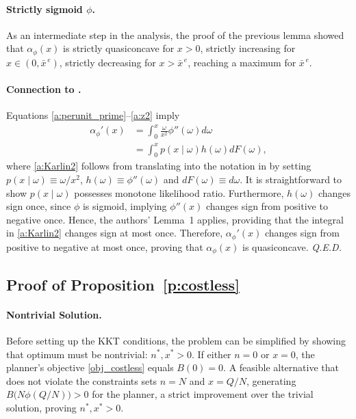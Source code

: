 \documentclass[12pt]{article}
\renewcommand{\qed}{{\it Q.E.D.}}
\newcommand{\efficacy}{\phi}
\newcommand{\benefit}{B}
\newcommand{\xunitbar}{\bar{x}^{\,e}}
\newcommand{\perunit}[1]{\alpha_{#1}}
\begin{document}
\paragraph{Strictly sigmoid $\efficacy$.} 

As an intermediate step in the analysis, the proof of the previous
lemma showed that $\perunit{\efficacy}\!(x)$ is strictly quasiconcave
for $x > 0$, strictly increasing for $x \in (0, \xunitbar)$, strictly
decreasing for $x > \xunitbar$, reaching a maximum for $\xunitbar$.

\paragraph{Connection to \citet{Karlin1956}.} 

Equations \eqref{a:perunit_prime}--\eqref{a:z2} imply
\begin{align}
\perunit{\efficacy}'\!(x) & = \int_0^x \frac{\omega}{x^2}
\efficacy''(\omega) d\omega \label{a:Karlin} \\ & = \int_0^x p(x \mid
\omega) h(\omega) dF(\omega), \label{a:Karlin2}
\end{align}
where \eqref{a:Karlin2} follows from translating into the notation in
\citet{Karlin1956} by setting $p(x\mid\omega) \equiv \omega / x^2$,
$h(\omega) \equiv \efficacy''(\omega)$ and $dF(\omega) \equiv
d\omega$. It is straightforward to show $p(x\mid\omega)$ possesses
monotone likelihood ratio. Furthermore, $h(\omega)$ changes sign once,
since $\efficacy$ is sigmoid, implying $\efficacy''(x)$ changes sign
from positive to negative once. Hence, the authors' Lemma~1 applies,
providing that the integral in \eqref{a:Karlin2} changes sign at most
once. Therefore, $\perunit{\efficacy}'\!(x)$ changes sign from
positive to negative at most once, proving that
$\perunit{\efficacy}\!(x)$ is quasiconcave. \qed


\subsection*{Proof of Proposition~\ref{p:costless}}

\paragraph{Nontrivial Solution.}

Before setting up the KKT conditions, the problem can be simplified by
showing that optimum must be nontrivial: $n^*, x^* > 0$.  If either $n
= 0$ or $x = 0$, the planner's objective \eqref{obj_costless} equals
$\benefit(0) = 0$. A feasible alternative that does not violate the
constraints sets $n = N$ and $x = Q/N$, generating $\benefit \bigl(
N\efficacy(Q/N) \bigr) > 0$ for the planner, a strict improvement over
the trivial solution, proving $n^*, x^* > 0$.
\end{document}
